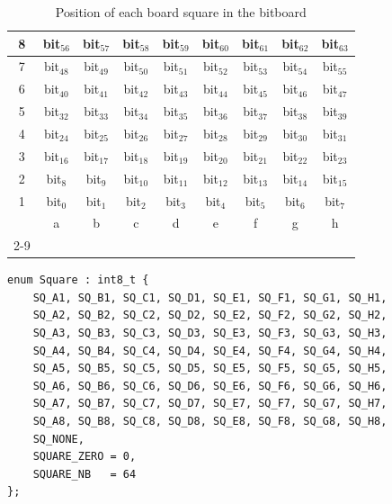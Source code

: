 \documentclass[12pt,a4paper,twoside,openright]{book}
\begin{document}
\begin{table}[htpb]
\centering
\caption{Position of each board square in the bitboard}
\label{tab:bitboard_indices}
\begin{tabular}{|c|c|c|c|c|c|c|c|c|}
\hline
8 & bit$_{56}$ & bit$_{57}$ & bit$_{58}$ & bit$_{59}$ & bit$_{60}$ & bit$_{61}$ & bit$_{62}$ & bit$_{63}$ \\ \hline
7 & bit$_{48}$ & bit$_{49}$ & bit$_{50}$ & bit$_{51}$ & bit$_{52}$ & bit$_{53}$ & bit$_{54}$ & bit$_{55}$ \\ \hline
6 & bit$_{40}$ & bit$_{41}$ & bit$_{42}$ & bit$_{43}$ & bit$_{44}$ & bit$_{45}$ & bit$_{46}$ & bit$_{47}$ \\ \hline
5 & bit$_{32}$ & bit$_{33}$ & bit$_{34}$ & bit$_{35}$ & bit$_{36}$ & bit$_{37}$ & bit$_{38}$ & bit$_{39}$ \\ \hline
4 & bit$_{24}$ & bit$_{25}$ & bit$_{26}$ & bit$_{27}$ & bit$_{28}$ & bit$_{29}$ & bit$_{30}$ & bit$_{31}$ \\ \hline
3 & bit$_{16}$ & bit$_{17}$ & bit$_{18}$ & bit$_{19}$ & bit$_{20}$ & bit$_{21}$ & bit$_{22}$ & bit$_{23}$ \\ \hline
2 & bit$_{8}$ & bit$_{9}$ & bit$_{10}$ & bit$_{11}$ & bit$_{12}$ & bit$_{13}$ & bit$_{14}$ & bit$_{15}$ \\ \hline
1 & bit$_{0}$ & bit$_{1}$ & bit$_{2}$ & bit$_{3}$ & bit$_{4}$ & bit$_{5}$ & bit$_{6}$ & bit$_{7}$ \\ \hline
\multicolumn{1}{c|}{} & a & b & c & d & e & f & g & h \\
\cline{2-9}
\end{tabular}
\end{table}

\begin{mdframed}[skipabove=\baselineskip,hidealllines=true]
\begin{verbatim}
enum Square : int8_t {
    SQ_A1, SQ_B1, SQ_C1, SQ_D1, SQ_E1, SQ_F1, SQ_G1, SQ_H1,
    SQ_A2, SQ_B2, SQ_C2, SQ_D2, SQ_E2, SQ_F2, SQ_G2, SQ_H2,
    SQ_A3, SQ_B3, SQ_C3, SQ_D3, SQ_E3, SQ_F3, SQ_G3, SQ_H3,
    SQ_A4, SQ_B4, SQ_C4, SQ_D4, SQ_E4, SQ_F4, SQ_G4, SQ_H4,
    SQ_A5, SQ_B5, SQ_C5, SQ_D5, SQ_E5, SQ_F5, SQ_G5, SQ_H5,
    SQ_A6, SQ_B6, SQ_C6, SQ_D6, SQ_E6, SQ_F6, SQ_G6, SQ_H6,
    SQ_A7, SQ_B7, SQ_C7, SQ_D7, SQ_E7, SQ_F7, SQ_G7, SQ_H7,
    SQ_A8, SQ_B8, SQ_C8, SQ_D8, SQ_E8, SQ_F8, SQ_G8, SQ_H8,
    SQ_NONE,
    SQUARE_ZERO = 0,
    SQUARE_NB   = 64
};
\end{verbatim}
\vspace{-0.5em}
\label{lst:squares}
\end{mdframed}
\end{document}
